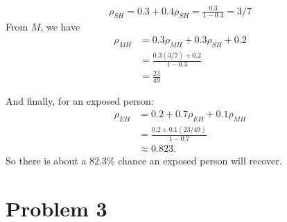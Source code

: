 \documentclass{homework}
\begin{document}
\begin{letterenum}
\begin{align*}
    \rho_{SH} = 0.3 + 0.4 \rho_{SH} = \frac{0.3}{1 - 0.4} = 3/7
\end{align*}
From $M$, we have
\begin{align*}
    \rho_{MH} &= 0.3 \rho_{MH} + 0.3 \rho_{SH} + 0.2 \\
        &= \frac{0.3 (3/7) + 0.2}{1 - 0.3} \\
        &= \frac{23}{49}
\end{align*}

And finally, for an exposed person:
\begin{align*}
    \rho_{EH} &= 0.2 + 0.7 \rho_{EH} + 0.1 \rho_{MH} \\
        &= \frac{0.2 + 0.1 (23/49)}{1 - 0.7} \\
        &\approx 0.823.
\end{align*}
So there is about a 82.3\% chance an exposed person will recover.

\end{letterenum}
\section{Problem 3}
\end{document}
